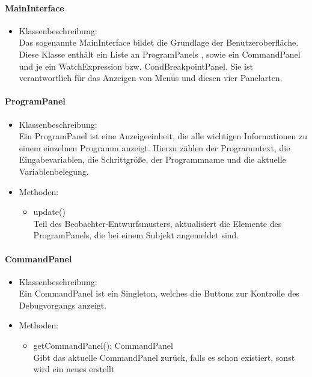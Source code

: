 \documentclass[parskip=full]{scrartcl}
\begin{document}
\paragraph{MainInterface}
\begin{itemize}
\item Klassenbeschreibung: \\
 Das sogenannte MainInterface bildet die Grundlage der Benutzeroberfläche. Diese Klasse enthält ein Liste an ProgramPanels , sowie ein CommandPanel und je ein WatchExpression bzw. CondBreakpointPanel. Sie ist verantwortlich für das Anzeigen von Menüs und diesen vier Panelarten. 
\end{itemize}

\paragraph{ProgramPanel}
\begin{itemize}
\item Klassenbeschreibung: \\
Ein ProgramPanel ist eine Anzeigeeinheit, die alle wichtigen Informationen zu einem einzelnen Programm anzeigt. Hierzu zählen der Programmtext, die Eingabevariablen, die Schrittgröße, der Programmname und die aktuelle Variablenbelegung.
\item Methoden: \\
\begin{itemize}
\item update() \\ Teil des Beobachter-Entwurfsmusters, aktualisiert die Elemente des ProgramPanels, die bei einem Subjekt angemeldet sind.
\end{itemize}
\end{itemize}

\paragraph{CommandPanel}
\begin{itemize}
\item Klassenbeschreibung: \\
Ein CommandPanel ist ein Singleton, welches die Buttons zur Kontrolle des Debugvorgangs anzeigt. 
\item Methoden: \\
\begin{itemize}
\item getCommandPanel(): CommandPanel \\
Gibt das aktuelle CommandPanel zurück, falls es schon existiert, sonst wird ein neues erstellt
\end{itemize}
\end{itemize}
\end{document}
